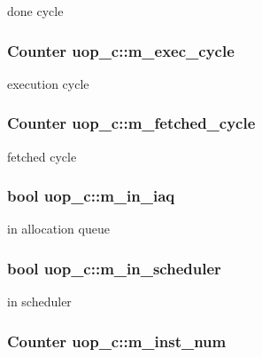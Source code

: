 \label{classuop__c_ae9691c0e5dbb1fbe05b57c25193ee0ce}
done cycle \hypertarget{classuop__c_a6817cdf4eb52076177cd8bea6c74089a}{
\subsubsection[{m\_\-exec\_\-cycle}]{\setlength{\rightskip}{0pt plus 5cm}Counter {\bf uop\_\-c::m\_\-exec\_\-cycle}}}
\label{classuop__c_a6817cdf4eb52076177cd8bea6c74089a}
execution cycle \hypertarget{classuop__c_a3b7c8dfe378d88ea32546fc5c45f6da2}{
\subsubsection[{m\_\-fetched\_\-cycle}]{\setlength{\rightskip}{0pt plus 5cm}Counter {\bf uop\_\-c::m\_\-fetched\_\-cycle}}}
\label{classuop__c_a3b7c8dfe378d88ea32546fc5c45f6da2}
fetched cycle \hypertarget{classuop__c_a4eac12f7b9397fe87befa0c280ba7a68}{
\subsubsection[{m\_\-in\_\-iaq}]{\setlength{\rightskip}{0pt plus 5cm}bool {\bf uop\_\-c::m\_\-in\_\-iaq}}}
\label{classuop__c_a4eac12f7b9397fe87befa0c280ba7a68}
in allocation queue \hypertarget{classuop__c_a1e781ac8a3b7a97b32051cd56cd6ff3c}{
\subsubsection[{m\_\-in\_\-scheduler}]{\setlength{\rightskip}{0pt plus 5cm}bool {\bf uop\_\-c::m\_\-in\_\-scheduler}}}
\label{classuop__c_a1e781ac8a3b7a97b32051cd56cd6ff3c}
in scheduler \hypertarget{classuop__c_a8f764aaa37e8d6cf7f5a9ce54b796f88}{
\subsubsection[{m\_\-inst\_\-num}]{\setlength{\rightskip}{0pt plus 5cm}Counter {\bf uop\_\-c::m\_\-inst\_\-num}}}
